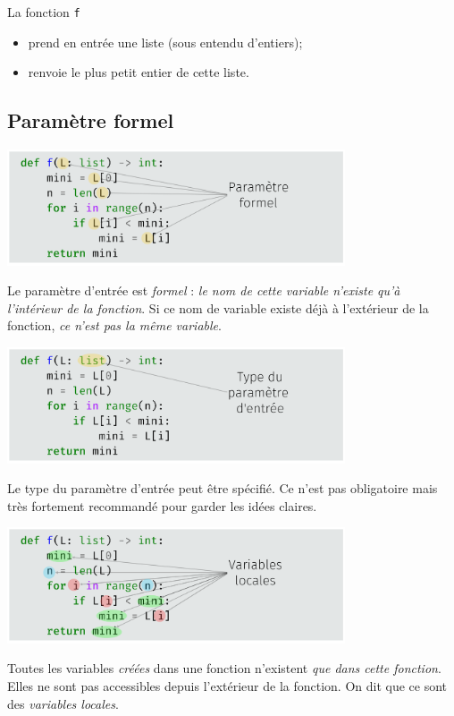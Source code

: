 La fonction \texttt{f}
\begin{itemize}
    \item   prend en entrée une liste (sous entendu d'entiers);
    \item   renvoie le plus petit entier de cette liste.
\end{itemize}

\subsection{Paramètre formel}
\begin{center}
    \includegraphics[width=10cm]{img/anat1}
\end{center}
Le paramètre d'entrée est \textit{formel} : \textit{le nom de cette variable n'existe qu'à l'intérieur de la fonction}.
Si ce nom de variable existe déjà à l'extérieur de la fonction, \textit{ce n'est pas la même variable}.\\
\begin{center}
    \includegraphics[width=10cm]{img/anat4}
\end{center}
Le type du paramètre d'entrée peut être spécifié. Ce n'est pas obligatoire mais très fortement recommandé pour \og garder les idées claires\fg{}.\\

\begin{center}
    \includegraphics[width=10cm]{img/anat2}
\end{center}
Toutes les variables \textit{créées} dans une fonction n'existent \textit{que dans cette fonction}. Elles ne sont pas accessibles depuis l'extérieur de la fonction. On dit que ce sont des \textit{variables locales}.\\

